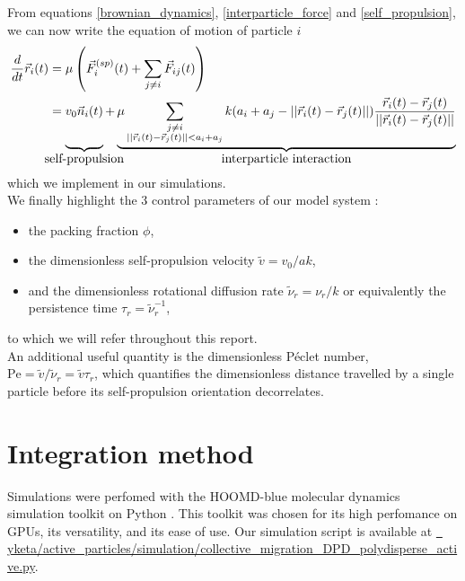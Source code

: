 \documentclass[class=report, float=false, crop=false]{standalone}
\begin{document}
From equations \ref{brownian_dynamics}, \ref{interparticle_force} and \ref{self_propulsion}, we can now write the equation of motion of particle $i$
\begin{equation}
\begin{aligned}
\frac{d}{dt}\vec{r}_i(t) &= \mu\left(\vec{F}_i^{(sp)}(t) + \sum_{j \neq i} \vec{F}_{ij}(t)\right)\\
&= \underbrace{v_0\vec{n}_i(t)\vphantom{\sum_{\substack{j \neq i \\ ||\vec{r}_i(t) - \vec{r}_j(t)|| < a_i + a_j}}}}_{\mathclap{\displaystyle\text{self-propulsion}}} + \underbrace{\mu \sum_{\substack{j \neq i \\ ||\vec{r}_i(t) - \vec{r}_j(t)|| < a_i + a_j}} k (a_i + a_j - ||\vec{r}_i(t) - \vec{r}_j(t)||)\frac{\vec{r}_i(t) - \vec{r}_j(t)}{||\vec{r}_i(t) - \vec{r}_j(t)||}}_{\displaystyle\text{interparticle interaction}}
\end{aligned}
\label{equation_motion}
\end{equation}
which we implement in our simulations.\\

We finally highlight the 3 control parameters of our model system \cite{fily2014freezing}:
\begin{itemize}
\item the packing fraction $\phi$,
\item the dimensionless self-propulsion velocity $\tilde{v} = v_0/ak$,
\item and the dimensionless rotational diffusion rate $\tilde{\nu}_r = \nu_r/k$ or equivalently the persistence time $\tau_r = \tilde{\nu}_r^{-1}$,
\end{itemize}
to which we will refer throughout this report.\\

An additional useful quantity is the dimensionless P\'eclet number, $\text{Pe} = \tilde{v}/\tilde{\nu}_r = \tilde{v}\tau_r$, which quantifies the dimensionless distance travelled by a single particle before its self-propulsion orientation decorrelates.

\section{Integration method}

Simulations were perfomed with the HOOMD-blue molecular dynamics simulation toolkit \cite{hoomd, anderson2008general, glaser2015strong, phillips2011pseudo} on Python \faPython. This toolkit was chosen for its high perfomance on GPUs, its versatility, and its ease of use. Our simulation script is available at \href{https://github.com/yketa/active_particles/blob/master/simulation/collective_migration_DPD_polydisperse_active.py}{{\faGithub~ yketa/active\_particles/simulation/collective\_migration\_DPD\_polydisperse\_active.py}}.
\end{document}
